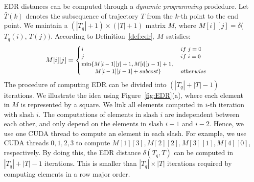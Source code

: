 \documentclass[10pt,conference,letterpaper]{IEEEtran}
\newcommand{\edr}{{\delta}\xspace}
\newcommand{\bigoh}{{\rm O}\xspace}
\begin{document}
EDR distances can be computed through a \emph{dynamic programming} prodedure. Let $\bar{T}(k)$ denotes the subsequence of trajectory $T$ from the $k$-th point to the end point.
We maintain a $(|T_q|+1)\times (|T|+1)$ matrix $M$, where $M[i][j]=\edr$($\bar{T_q}(i)$, $\bar{T}(j))$. According to Definition~\ref{def:edr}, $M$ satisfies:
\begin{equation}
\scriptsize
M[i][j]=
\begin{cases}
i &\mbox{~if~}j=0\\
j &\mbox{~if~}i=0\\
\min\{M[i-1][j]+1, M[i][j-1]+1, &\\
~~~~~~~M[i-1][j-1]+subcost \} &\mbox{~otherwise~}
\end{cases}
\end{equation}
%
%
The procedure of computing EDR can be divided into $(|T_q|+|T|-1)$ iterations. We illustrate the idea using Figure~\ref{fig:EDR}(a), where each element in $M$ is represented by a square. We link all elements computed in $i$-th iteration with slash $i$. The computations of elements in slash $i$ are independent between each other, and only depend on the elements in slash $i-1$ and $i-2$.
Hence, we use one CUDA thread to compute an element in each slash.
For example, we use CUDA threads $0, 1,2,3$ to compute $M[1][3],M[2][2],M[3][1], M[4][0]$, respectively.
By doing this, the EDR distance $\edr(T_q, T)$ can be computed in $|T_q|+|T|-1$ iterations. This is smaller than $|T_q|\times |T|$ iterations required by computing elements in a row major order.
\end{document}
